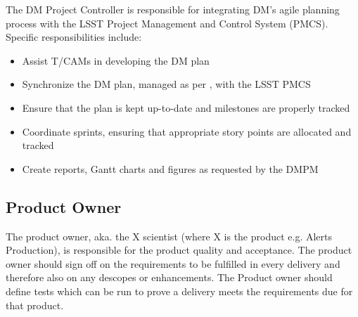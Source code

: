The DM Project Controller is responsible for integrating DM's agile planning process with the LSST Project Management and Control System (PMCS). Specific responsibilities include:

\begin{itemize}

  \item{Assist T/CAMs in developing the DM plan}
  \item{Synchronize the DM plan, managed as per , with the LSST PMCS}
  \item{Ensure that the plan is kept up-to-date and milestones are properly tracked}
  \item{Coordinate sprints, ensuring that appropriate story points are allocated and tracked}
  \item{Create reports, Gantt charts and figures as requested by the DMPM}

\end{itemize}

\subsection{Product Owner \label{role:prodo}}

The product owner, aka. the X scientist (where X is the product e.g. Alerts Production), is responsible for the product quality and acceptance.
The product owner should sign off on the requirements to be fulfilled in every delivery and therefore also on any descopes or enhancements.
The Product owner should define tests which can be run to prove a delivery meets the requirements due for that product.

